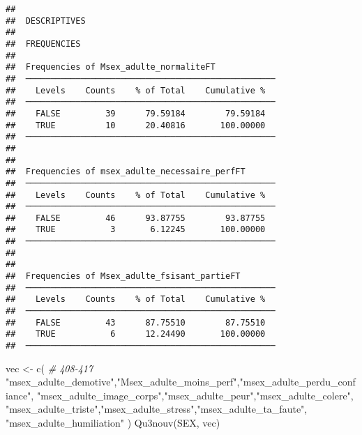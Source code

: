 \documentclass[
]{article}
\newenvironment{Shaded}{\begin{snugshade}}{\end{snugshade}}
\newcommand{\CommentTok}[1]{\textcolor[rgb]{0.56,0.35,0.01}{\textit{#1}}}
\newcommand{\FunctionTok}[1]{\textcolor[rgb]{0.00,0.00,0.00}{#1}}
\newcommand{\NormalTok}[1]{#1}
\newcommand{\OtherTok}[1]{\textcolor[rgb]{0.56,0.35,0.01}{#1}}
\newcommand{\StringTok}[1]{\textcolor[rgb]{0.31,0.60,0.02}{#1}}
\begin{document}
\begin{verbatim}
## 
##  DESCRIPTIVES
## 
##  FREQUENCIES
## 
##  Frequencies of Msex_adulte_normaliteFT             
##  ────────────────────────────────────────────────── 
##    Levels    Counts    % of Total    Cumulative %   
##  ────────────────────────────────────────────────── 
##    FALSE         39      79.59184        79.59184   
##    TRUE          10      20.40816       100.00000   
##  ────────────────────────────────────────────────── 
## 
## 
##  Frequencies of msex_adulte_necessaire_perfFT       
##  ────────────────────────────────────────────────── 
##    Levels    Counts    % of Total    Cumulative %   
##  ────────────────────────────────────────────────── 
##    FALSE         46      93.87755        93.87755   
##    TRUE           3       6.12245       100.00000   
##  ────────────────────────────────────────────────── 
## 
## 
##  Frequencies of Msex_adulte_fsisant_partieFT        
##  ────────────────────────────────────────────────── 
##    Levels    Counts    % of Total    Cumulative %   
##  ────────────────────────────────────────────────── 
##    FALSE         43      87.75510        87.75510   
##    TRUE           6      12.24490       100.00000   
##  ──────────────────────────────────────────────────
\end{verbatim}

\begin{Shaded}
\begin{Highlighting}[]
\NormalTok{vec }\OtherTok{\textless{}{-}} \FunctionTok{c}\NormalTok{(  }\CommentTok{\# 408{-}417}
  \StringTok{"msex\_adulte\_demotive"}\NormalTok{,}\StringTok{"Msex\_adulte\_moins\_perf"}\NormalTok{,}\StringTok{"msex\_adulte\_perdu\_confiance"}\NormalTok{,}
  \StringTok{"msex\_adulte\_image\_corps"}\NormalTok{,}\StringTok{"msex\_adulte\_peur"}\NormalTok{,}\StringTok{"msex\_adulte\_colere"}\NormalTok{,}
  \StringTok{"msex\_adulte\_triste"}\NormalTok{,}\StringTok{"msex\_adulte\_stress"}\NormalTok{,}\StringTok{"msex\_adulte\_ta\_faute"}\NormalTok{,}
  \StringTok{"msex\_adulte\_humiliation"}
\NormalTok{  )}
\FunctionTok{Qu3nouv}\NormalTok{(SEX, vec)}
\end{Highlighting}
\end{Shaded}
\end{document}
